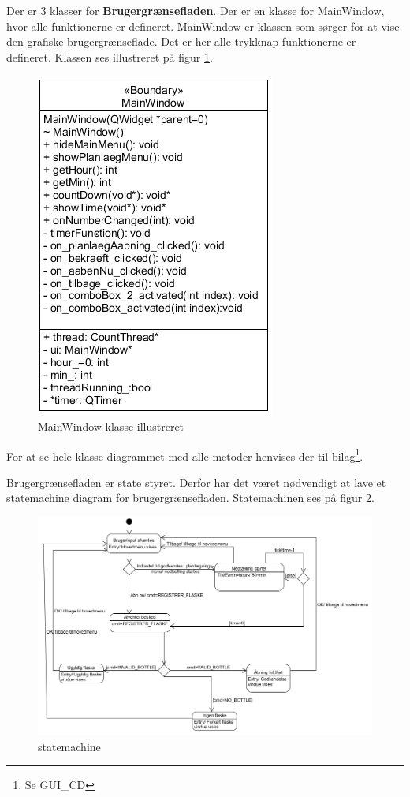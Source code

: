 Der er 3 klasser for \textbf{Brugergrænsefladen}. Der er en klasse for MainWindow, hvor alle funktionerne er defineret. MainWindow er klassen som sørger for at vise den grafiske brugergrænseflade. Det er her alle trykknap funktionerne er defineret. Klassen ses illustreret på figur \ref{MW_CD}. 

\begin{figure}[H]
	\centerline{\includegraphics[scale=1]{tex/Design/GUI/Fotos/MainWindow}}
	\caption{MainWindow klasse illustreret}
	\label{MW_CD}
\end{figure}

For at se hele klasse diagrammet med alle metoder henvises der til bilag\footnote{Se GUI\_CD}.

Brugergrænsefladen er state styret. Derfor har det været nødvendigt at lave et statemachine diagram for brugergrænsefladen. Statemachinen ses på figur \ref{sm}.\\

\begin{figure}[H]
	\centerline{\includegraphics[scale=1]{tex/Design/GUI/Fotos/sm}}
	\caption{statemachine}
	\label{sm}
\end{figure}

